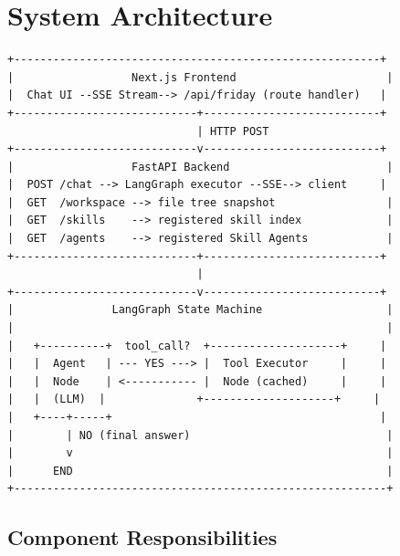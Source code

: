 \documentclass[11pt,a4paper]{article}
\begin{document}
\section{System Architecture}

\begin{lstlisting}[language={},title={High-level data flow}]
+--------------------------------------------------------+
|                  Next.js Frontend                       |
|  Chat UI --SSE Stream--> /api/friday (route handler)   |
+----------------------------+---------------------------+
                             | HTTP POST
+----------------------------v---------------------------+
|                  FastAPI Backend                        |
|  POST /chat --> LangGraph executor --SSE--> client     |
|  GET  /workspace --> file tree snapshot                 |
|  GET  /skills    --> registered skill index             |
|  GET  /agents    --> registered Skill Agents            |
+----------------------------+---------------------------+
                             |
+----------------------------v---------------------------+
|               LangGraph State Machine                   |
|                                                         |
|   +----------+  tool_call?  +--------------------+     |
|   |  Agent   | --- YES ---> |  Tool Executor     |     |
|   |  Node    | <----------- |  Node (cached)     |     |
|   |  (LLM)  |              +--------------------+     |
|   +----+-----+                                         |
|        | NO (final answer)                              |
|        v                                                |
|      END                                                |
+---------------------------------------------------------+
\end{lstlisting}

\subsection{Component Responsibilities}
\end{document}
